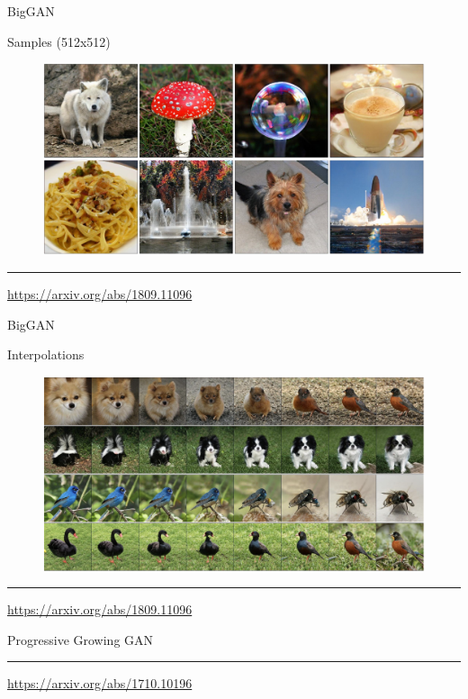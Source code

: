 \documentclass{beamer}
\begin{document}
\begin{frame}{BigGAN}
	\begin{block}{Samples (512x512)}
		\begin{figure}
			\centering
			\includegraphics[width=\linewidth]{figs/biggan_samples}
		\end{figure}
	\end{block}
	\vfill
	\hrule\medskip 
	{\scriptsize \href{https://arxiv.org/abs/1809.11096}{https://arxiv.org/abs/1809.11096}}
\end{frame}
\begin{frame}{BigGAN}
	\begin{block}{Interpolations}
		\begin{figure}
			\centering
			\includegraphics[width=\linewidth]{figs/biggan_interpolations}
		\end{figure}
	\end{block}
	\vfill
	\hrule\medskip 
	{\scriptsize \href{https://arxiv.org/abs/1809.11096}{https://arxiv.org/abs/1809.11096}}
\end{frame}
\begin{frame}{Progressive Growing GAN}
	
	\vfill
	\hrule\medskip 
	{\scriptsize \href{https://arxiv.org/abs/1710.10196}{https://arxiv.org/abs/1710.10196}}
\end{frame}
\end{document}
